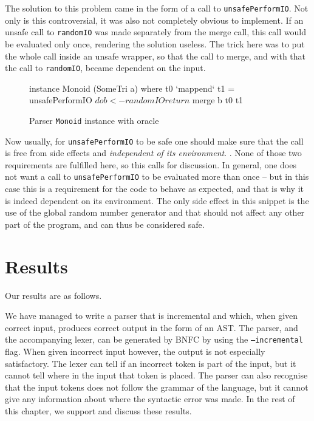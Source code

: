 \documentclass[a4paper,12pt,notitlepage]{report}
\renewcommand\cite{\citep}
\begin{document}
The solution to this problem came in the form of a call to
\texttt{unsafePerformIO}. Not only is this controversial, it was also not
completely obvious to implement. If an unsafe call to \texttt{randomIO} was made
separately from the merge call, this call would be evaluated only once,
rendering the solution useless. The trick here was to put the whole call inside
an unsafe wrapper, so that the call to merge, and with that the call to
\texttt{randomIO}, became dependent on the input.

\begin{figure}[H]
\begin{code}
instance Monoid (SomeTri a) where
    t0 `mappend` t1 = unsafePerformIO $ do
      b <- randomIO
      return $ merge b t0 t1
\end{code}
\caption{\small Parser \texttt{Monoid} instance with oracle}
\end{figure}

Now usually, for \texttt{unsafePerformIO} to be safe one should make sure that
the call is free from side effects and \textit{independent of its environment}.
\cite{unsafeHackage}. None of those two requirements are fulfilled here, so 
this calls for discussion. In general, one does not want a call to
\texttt{unsafePerformIO} to be evaluated more than once -- but in this case this
is a requirement for the code to behave as expected, and that is why it is indeed
dependent on its environment. The only side effect in this snippet is the use of
the global random number generator and that should not affect any other part of
the program, and can thus be considered safe.

%
%

\chapter{Results}
Our results are as follows.

We have managed to write a parser that is incremental and which, when given
correct input, produces correct output in the form of an AST. The parser, and
the accompanying lexer, can be generated by BNFC by using the
\texttt{---incremental} flag. When given incorrect input however, the output is
not especially satisfactory. The lexer can tell if an incorrect token is part of
the input, but it cannot tell where in the input that token is placed. The
parser can also recognise that the input tokens does not follow the grammar of
the language, but it cannot give any information about where the syntactic error
was made. In the rest of this chapter, we support and discuss these results. 
\end{document}
